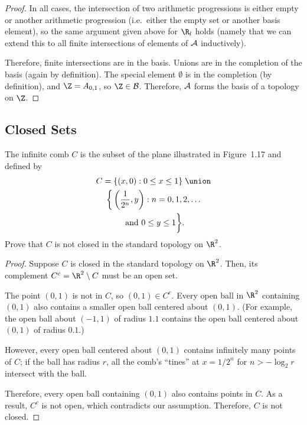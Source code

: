\documentclass[twocolumn, noxcolor, maketitle]{rbt-mathnotes-hw}
\def\basis{\mathcal{B}}
\begin{document}
\begin{proof}
  In all cases, the intersection of two arithmetic progressions is either empty or
  another arithmetic progression (i.e.~either the empty set or another basis
  element), so the same argument given above for $\R_l$ holds (namely that we can
  extend this to all finite intersections of elements of $\mathcal{A}$ inductively).

  Therefore, finite intersections are in the basis. Unions are in the completion
  of the basis (again by definition). The special element $\emptyset$ is in the
  completion (by definition), and $\Z = \Ar01$, so $\Z \in \basis$. Therefore,
  $\mathcal{A}$ forms the basis of a topology on $\Z$.
\end{proof}

\pagebreak
\subsection{Closed Sets}
\begin{problem}[1.27(a)]
  The infinite comb $C$ is the subset of the plane illustrated in Figure~1.17
  and defined by
  \begin{multline*}
    C = \{(x,0) : 0 \le x \le 1\} \;\union \\
    \bigg\{ \left( \frac{1}{2^n}, y \right) : n = 0,1,2, \dots \\
      \text{ and } 0 \le y \le 1 \bigg\}.   
  \end{multline*}
  Prove that $C$ is not closed in the standard topology on $\R^2$.
\end{problem}
\begin{proof}
  Suppose $C$ is closed in the standard topology on $\R^2$. Then, its complement
  $C^c = \R^2 \setminus C$ must be an open set.

  The point $(0, 1)$ is not in $C$, so $(0, 1) \in C^c$. Every open ball in $\R^2$
  containing $(0, 1)$ also contains a smaller open ball centered about $(0, 1)$.
  (For example, the open ball about $(-1, 1)$ of radius $1.1$ contains the open
  ball centered about $(0, 1)$ of radius $0.1$.)

  However, every open ball centered about $(0, 1)$ contains infinitely many
  points of $C$; if the ball has radius $r$, all the comb's ``tines'' at $x =
  1/2^n$ for $n > - \log_2 r$ intersect with the ball.

  Therefore, every open ball containing $(0, 1)$ also contains points in $C$. As
  a result, $C^c$ is not open, which contradicts our assumption. Therefore, $C$
  is not closed.
\end{proof}
\end{document}
